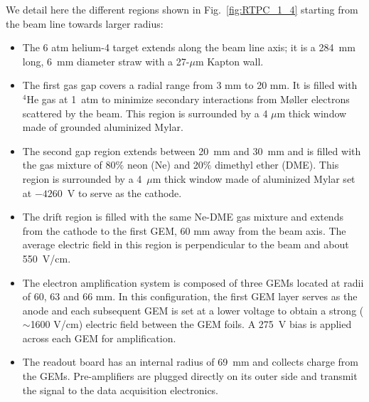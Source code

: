 \documentclass[preprint,5p]{elsarticle}
\begin{document}
We detail here the different regions shown in Fig.~\ref{fig:RTPC_1_4} starting 
from the beam line towards larger radius:\\
\begin{itemize}
   \item The 6 atm helium-4 target extends along the beam line axis; it 
      is a 284~mm long, 6~mm diameter straw with a 27-$\mu$m Kapton wall.
   \item The first gas gap covers a radial range from 3 mm to 20 mm. It is 
      filled with $^{4}$He gas at 1~atm to minimize secondary interactions from
      M\o{}ller electrons scattered by the beam. This region is surrounded by 
      a 4 $\mu$m thick window made of grounded aluminized Mylar.
   \item The second gap region extends between 20~mm and 30~mm and is filled with the 
      gas mixture of 80$\%$ neon (Ne) and 20$\%$ dimethyl ether (DME). This region 
      is surrounded by a 4~$\mu$m thick window made of aluminized Mylar set at $- 4260$~V 
      to serve as the cathode.
   \item The drift region is filled with the same Ne-DME gas mixture and extends 
      from the cathode to the first GEM, 60 mm away from the beam axis. The average 
      electric field in this region is perpendicular to the beam and about 550~V/cm.
   \item The electron amplification system is composed of three GEMs located at 
      radii of 60, 63 and 66 mm. In this configuration, the first GEM layer 
      serves as the anode and each subsequent GEM is set at a lower voltage to
      obtain a strong ($\sim$1600 V/cm) electric field between the GEM foils. A 
      275~V bias is applied across each GEM for amplification.
   \item The readout board has an internal radius of 69~mm and collects charge
     from the GEMs. Pre-amplifiers are plugged directly on its outer side and
     transmit the signal to the data acquisition electronics.
\end{itemize}
\end{document}
